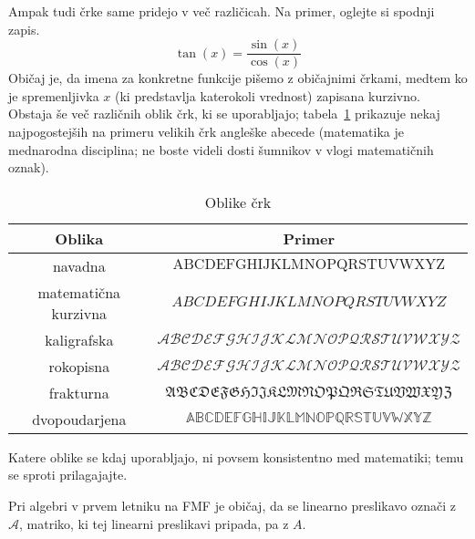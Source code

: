                 Ampak tudi črke same pridejo v več različicah. Na primer, oglejte si spodnji zapis.
                \[\tan(x) = \frac{\sin(x)}{\cos(x)}\]
                Običaj je, da imena za konkretne funkcije pišemo z običajnimi črkami, medtem ko je spremenljivka $x$ (ki predstavlja katerokoli vrednost) zapisana kurzivno. Obstaja še več različnih oblik črk, ki se uporabljajo; tabela~\ref{tabela:oblike-crk} prikazuje nekaj najpogostejših na primeru velikih črk angleške abecede (matematika je mednarodna disciplina; ne boste videli dosti šumnikov v vlogi matematičnih oznak).

                \begin{table}[!ht]
                        \centering
                        \begin{tabular}{c|c}
                                \textbf{Oblika} & \textbf{Primer} \\
                                \hline
                                navadna & $\mathrm{ABCDEFGHIJKLMNOPQRSTUVWXYZ}$ \\
                                matematična kurzivna & $ABCDEFGHIJKLMNOPQRSTUVWXYZ$ \\
                                kaligrafska & $\mathcal{ABCDEFGHIJKLMNOPQRSTUVWXYZ}$ \\
                                rokopisna & $\mathscr{ABCDEFGHIJKLMNOPQRSTUVWXYZ}$ \\
                                frakturna & $\mathfrak{ABCDEFGHIJKLMNOPQRSTUVWXYZ}$ \\
                                dvopoudarjena & $\mathbb{ABCDEFGHIJKLMNOPQRSTUVWXYZ}$
                        \end{tabular}
                        \caption{Oblike črk}\label{tabela:oblike-crk}
                \end{table}



                Katere oblike se kdaj uporabljajo, ni povsem konsistentno med matematiki; temu se sproti prilagajajte.

                \begin{zgled}
                        Pri algebri v prvem letniku na FMF je običaj, da se linearno preslikavo označi z $\mathcal{A}$, matriko, ki tej linearni preslikavi pripada, pa z $A$.
                \end{zgled}

